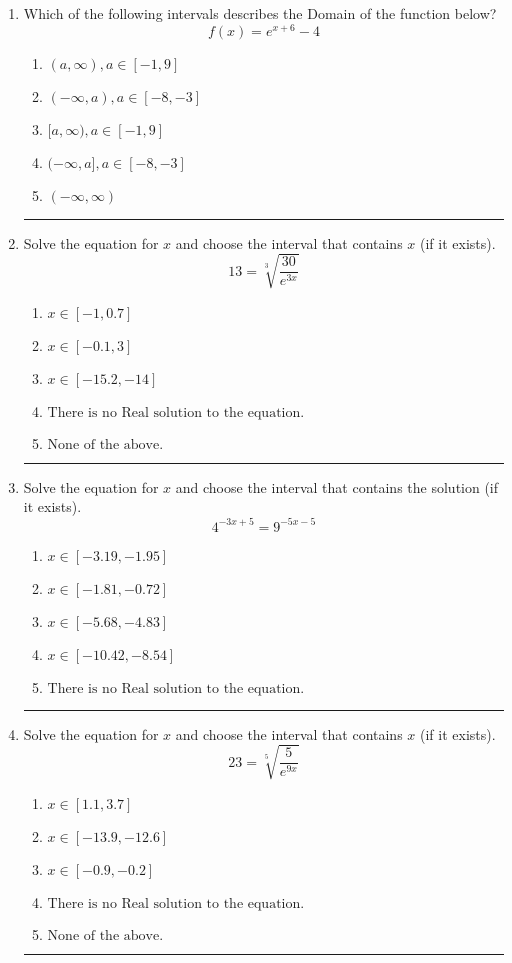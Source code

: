 \documentclass[14pt]{extbook}
\newcommand{\litem}[1]{\item#1\hspace*{-1cm}\rule{\textwidth}{0.4pt}}
\begin{document}
\begin{enumerate}
{\begin{enumerate}[label=\Alph*.]
\end{enumerate} }
\litem{
Which of the following intervals describes the Domain of the function below?\[ f(x) = e^{x+6}-4 \]\begin{enumerate}[label=\Alph*.]
\item \( (a, \infty), a \in [-1, 9] \)
\item \( (-\infty, a), a \in [-8, -3] \)
\item \( [a, \infty), a \in [-1, 9] \)
\item \( (-\infty, a], a \in [-8, -3] \)
\item \( (-\infty, \infty) \)

\end{enumerate} }
\litem{
 Solve the equation for $x$ and choose the interval that contains $x$ (if it exists).\[  13 = \sqrt[3]{\frac{30}{e^{3x}}} \]\begin{enumerate}[label=\Alph*.]
\item \( x \in [-1, 0.7] \)
\item \( x \in [-0.1, 3] \)
\item \( x \in [-15.2, -14] \)
\item \( \text{There is no Real solution to the equation.} \)
\item \( \text{None of the above.} \)

\end{enumerate} }
\litem{
Solve the equation for $x$ and choose the interval that contains the solution (if it exists).\[ 4^{-3x+5} = 9^{-5x-5} \]\begin{enumerate}[label=\Alph*.]
\item \( x \in [-3.19, -1.95] \)
\item \( x \in [-1.81, -0.72] \)
\item \( x \in [-5.68, -4.83] \)
\item \( x \in [-10.42, -8.54] \)
\item \( \text{There is no Real solution to the equation.} \)

\end{enumerate} }
\litem{
 Solve the equation for $x$ and choose the interval that contains $x$ (if it exists).\[  23 = \sqrt[5]{\frac{5}{e^{9x}}} \]\begin{enumerate}[label=\Alph*.]
\item \( x \in [1.1, 3.7] \)
\item \( x \in [-13.9, -12.6] \)
\item \( x \in [-0.9, -0.2] \)
\item \( \text{There is no Real solution to the equation.} \)
\item \( \text{None of the above.} \)


\end{enumerate}}
\end{enumerate}
\end{document}
